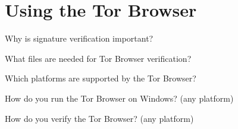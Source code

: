\documentclass{exam}
\begin{document}
\section{Using the Tor Browser}
\begin{questions}


\question Why is signature verification important? 

\begin{solutionorlines}[1in]
\end{solutionorlines}

\question What files are needed for Tor Browser verification? 
\begin{solutionorlines}[1in]
\end{solutionorlines}

\question Which platforms are supported by the Tor Browser?
\begin{solutionorlines}[1in]
\end{solutionorlines}

\question How do you run the Tor Browser on Windows? (any platform)
\begin{solutionorlines}[1in]
\end{solutionorlines}

\question How do you verify the Tor Browser? (any platform)
\begin{solutionorlines}[1in]
\end{solutionorlines}

\end{questions}
\end{document}
